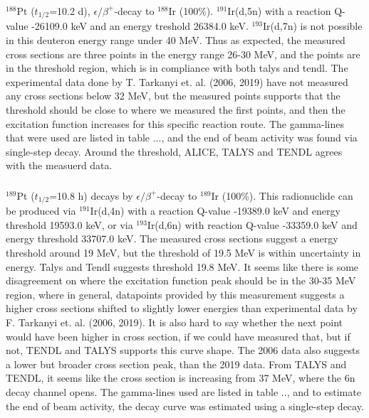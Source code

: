 \documentclass[a4paper,11pt,twoside]{book}
\begin{document}
\subsubsection{}
$^{188}$Pt ($t_{1/2}$=10.2 d), $\epsilon/\beta^+$-decay to $^{188}$Ir (100\%). $^{191}$Ir(d,5n) with a reaction Q-value -26109.0 keV and an energy treshold 26384.0 keV. $^{193}$Ir(d,7n) is not possible in this deuteron energy range under 40 MeV. Thus as expected, the measured cross sections are three points in the energy range 26-30 MeV, and the points are in the threshold region, which is in compliance with both talys and tendl. The experimental data done by T. Tarkanyi et. al. (2006, 2019) have not measured any cross sections below 32 MeV, but the measured points supports that the threshold should be close to where we measured the first points, and then the excitation function increases for this specific reaction route. The gamma-lines that were used are listed in table ..., and the end of beam activity was found via single-step decay.  Around the threshold, ALICE, TALYS and TENDL agrees with the measuerd data. 

\subsubsection{}
$^{189}$Pt ($t_{1/2}$=10.8 h) decays by $\epsilon/\beta^+$-decay to $^{189}$Ir (100\%). This radionuclide can be produced via $^{191}$Ir(d,4n) with a reaction Q-value -19389.0 keV and energy threshold 19593.0 keV, or via $^{193}$Ir(d,6n) with reaction Q-value -33359.0 keV and energy threshold 33707.0 keV. The measured cross sections suggest a energy threshold around 19 MeV, but the threshold of 19.5 MeV is within uncertainty in energy. Talys and Tendl suggests threshold 19.8 MeV. It seems like there is some disagreement on where the excitation function peak should be in the 30-35 MeV region, where in general, datapoints provided by this measurement suggests a higher cross sections shifted to slightly lower energies than experimental data by F. Tarkanyi et. al. (2006, 2019). It is also hard to say whether the next point would have been higher in cross section, if we could have measured that, but if not, TENDL and TALYS supports this curve shape. The 2006 data also suggests a lower but broader cross section peak, than the 2019 data. From TALYS and TENDL, it seems like the cross section is increasing from 37 MeV, where the 6n decay channel opens. The gamma-lines used are listed in table .., and to estimate the end of beam activity, the decay curve was estimated using a single-step decay. 
\end{document}
